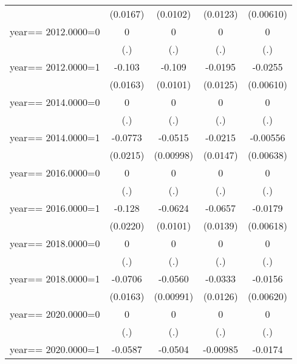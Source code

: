\begin{table}[htbp]
\begin{tabular}{l*{4}{c}}
                & (0.0167)         & (0.0102)         & (0.0123)         &(0.00610)         \\
year==  2012.0000=0&        0         &        0         &        0         &        0         \\
                &      (.)         &      (.)         &      (.)         &      (.)         \\
year==  2012.0000=1&   -0.103\sym{***}&   -0.109\sym{***}&  -0.0195         &  -0.0255\sym{***}\\
                & (0.0163)         & (0.0101)         & (0.0125)         &(0.00610)         \\
year==  2014.0000=0&        0         &        0         &        0         &        0         \\
                &      (.)         &      (.)         &      (.)         &      (.)         \\
year==  2014.0000=1&  -0.0773\sym{***}&  -0.0515\sym{***}&  -0.0215         & -0.00556         \\
                & (0.0215)         &(0.00998)         & (0.0147)         &(0.00638)         \\
year==  2016.0000=0&        0         &        0         &        0         &        0         \\
                &      (.)         &      (.)         &      (.)         &      (.)         \\
year==  2016.0000=1&   -0.128\sym{***}&  -0.0624\sym{***}&  -0.0657\sym{***}&  -0.0179\sym{***}\\
                & (0.0220)         & (0.0101)         & (0.0139)         &(0.00618)         \\
year==  2018.0000=0&        0         &        0         &        0         &        0         \\
                &      (.)         &      (.)         &      (.)         &      (.)         \\
year==  2018.0000=1&  -0.0706\sym{***}&  -0.0560\sym{***}&  -0.0333\sym{***}&  -0.0156\sym{**} \\
                & (0.0163)         &(0.00991)         & (0.0126)         &(0.00620)         \\
year==  2020.0000=0&        0         &        0         &        0         &        0         \\
                &      (.)         &      (.)         &      (.)         &      (.)         \\
year==  2020.0000=1&  -0.0587\sym{***}&  -0.0504\sym{***}& -0.00985         &  -0.0174\sym{***}\\

\end{tabular}
\end{table}
